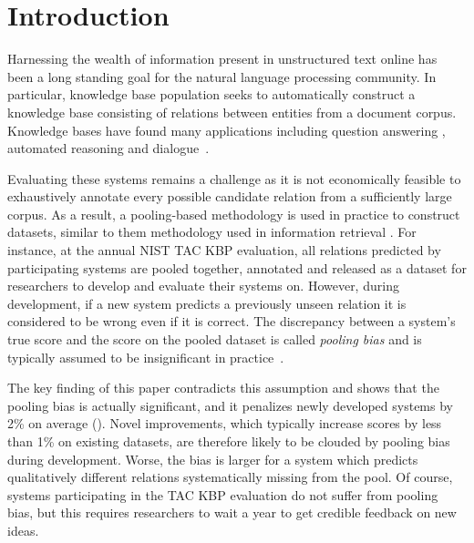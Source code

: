 \chapter{Introduction}
\label{chap:intro}

Harnessing the wealth of information present in unstructured text online has been a long standing goal for the natural language processing community.
In particular, knowledge base population seeks to automatically construct a knowledge base consisting of relations between entities from a document corpus. %
Knowledge bases have found many applications including question answering \citep{berant2013freebase, fader2014open,reddy2014large}, automated reasoning \citep{kalyanpur2012structured} and dialogue~\citep{han2015exploiting}.

Evaluating these systems remains a challenge as it is not economically feasible to exhaustively annotate every possible candidate relation from a sufficiently large corpus.
As a result, a pooling-based methodology is used in practice to construct datasets, similar to them methodology used in information retrieval \citep{sparck1975report, harman1993trec}.
For instance, at the annual NIST TAC KBP evaluation, all relations predicted by participating systems are pooled together, annotated and released as a dataset for researchers to develop and evaluate their systems on.
However, during development, if a new system predicts a previously unseen relation it is considered to be wrong even if it is correct.
The discrepancy between a system's true score and the score on the pooled dataset is called \emph{pooling bias} and is typically assumed to be insignificant in practice~\citep{zobel1998reliable}.

The key finding of this paper contradicts this assumption and shows that the pooling bias is actually significant, and it penalizes newly developed systems by 2\% \fone{} on average ().
Novel improvements, which typically increase scores by less than 1\% \fone{} on existing datasets, are therefore likely to be clouded by pooling bias during development.
Worse, the bias is larger for a system which predicts qualitatively different relations systematically missing from the pool.
Of course, systems participating in the TAC KBP evaluation do not suffer from pooling bias, but this requires researchers to wait a year to get credible feedback on new ideas.

